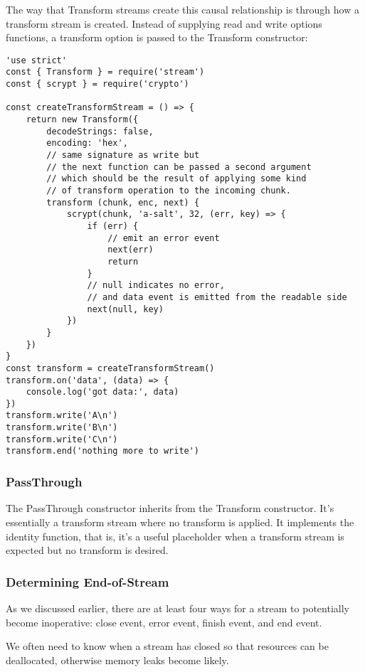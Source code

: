 \documentclass{scrartcl}
\begin{document}
The way that Transform streams create this causal relationship is through how a transform stream is created. Instead of supplying read and write options functions, a transform option is passed to the Transform constructor:


\begin{lstlisting}[style=ES6]
'use strict'
const { Transform } = require('stream')
const { scrypt } = require('crypto')

const createTransformStream = () => {
    return new Transform({
        decodeStrings: false,
        encoding: 'hex',
        // same signature as write but
        // the next function can be passed a second argument
        // which should be the result of applying some kind
        // of transform operation to the incoming chunk.
        transform (chunk, enc, next) {
            scrypt(chunk, 'a-salt', 32, (err, key) => {
                if (err) {
                    // emit an error event
                    next(err)
                    return
                }
                // null indicates no error,
                // and data event is emitted from the readable side
                next(null, key)
            })
        }
    })
}
const transform = createTransformStream()
transform.on('data', (data) => {
    console.log('got data:', data)
})
transform.write('A\n')
transform.write('B\n')
transform.write('C\n')
transform.end('nothing more to write')

\end{lstlisting}

\subsubsection{PassThrough}

The PassThrough constructor inherits from the Transform constructor. It's essentially a transform stream where no transform is applied. It implements the identity function, that is, it's a useful placeholder when a transform stream is expected but no transform is desired.

\subsubsection{Determining End-of-Stream}

As we discussed earlier, there are at least four ways for a stream to potentially become inoperative: close event, error event, finish event, and end event.

We often need to know when a stream has closed so that resources can be deallocated, otherwise memory leaks become likely.
\end{document}
